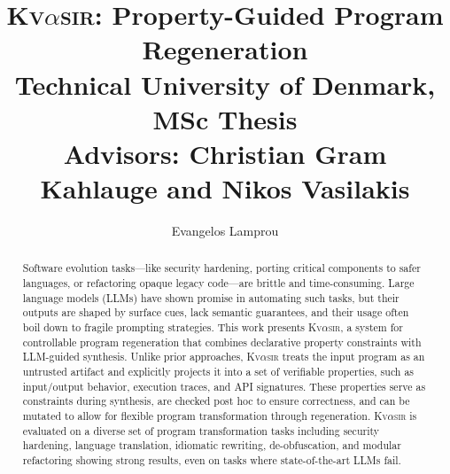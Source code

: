 \documentclass[nonacm,sigplan]{acmart}
\newcommand{\sys}{{\scshape Kv{$\alpha$}sir}\xspace}
\begin{document}
\title[Property-Guided Program Regeneration]{\sys: Property-Guided Program Regeneration\\{\vspace{1em}\large Technical University of Denmark, MSc Thesis {\\\vspace{-1em}} Advisors: Christian Gram Kahlauge and Nikos Vasilakis}}
\author{Evangelos Lamprou}



\begin{abstract}
  Software evolution tasks---like security hardening, porting critical components to safer 
  languages, or refactoring opaque legacy code---are brittle and time-consuming.
  Large language models (LLMs) have shown promise in automating such tasks,
  but their outputs are shaped by surface cues, lack
  semantic guarantees, and their usage often boil down to fragile prompting strategies.
This work presents \sys, a system for controllable program regeneration that
  combines declarative property constraints with LLM-guided synthesis. Unlike
  prior approaches, \sys treats the input program as an untrusted artifact and
  explicitly projects it into a set of verifiable properties, such as
  input/output behavior, execution traces, and API signatures. These properties
  serve as constraints during synthesis, are checked post hoc to ensure
  correctness, and can be mutated to allow for flexible program transformation through regeneration.
\sys is evaluated on a diverse set of program transformation tasks
including security hardening, language translation, idiomatic rewriting, de-obfuscation,
and modular refactoring showing strong results, even on tasks where state-of-the-art LLMs fail.
\end{abstract}
\maketitle
\end{document}
